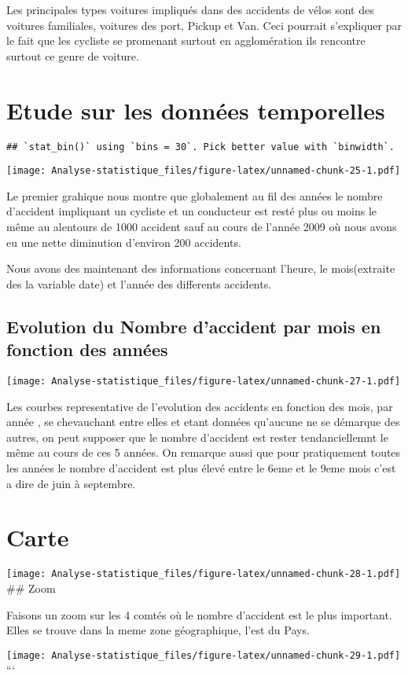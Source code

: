 \documentclass[
  french,
]{article}
\begin{document}
Les principales types voitures impliqués dans des accidents de vélos
sont des voitures familiales, voitures des port, Pickup et Van. Ceci
pourrait s'expliquer par le fait que les cycliste se promenant surtout
en agglomération ils rencontre surtout ce genre de voiture.

\hypertarget{etude-sur-les-donnuxe9es-temporelles}{%
\section{Etude sur les données
temporelles}\label{etude-sur-les-donnuxe9es-temporelles}}

\begin{verbatim}
## `stat_bin()` using `bins = 30`. Pick better value with `binwidth`.
\end{verbatim}

\texttt{[image: Analyse-statistique\_files/figure-latex/unnamed-chunk-25-1.pdf]}

Le premier grahique nous montre que globalement au fil des années le
nombre d'accident impliquant un cycliste et un conducteur est resté plus
ou moins le même au alentours de 1000 accident sauf au cours de l'année
2009 où nous avons eu une nette diminution d'environ 200 accidents.

Nous avons des maintenant des informations concernant l'heure, le
mois(extraite des la variable date) et l'année des differents accidents.

\hypertarget{evolution-du-nombre-daccident-par-mois-en-fonction-des-annuxe9es}{%
\subsection{Evolution du Nombre d'accident par mois en fonction des
années}\label{evolution-du-nombre-daccident-par-mois-en-fonction-des-annuxe9es}}

\texttt{[image: Analyse-statistique\_files/figure-latex/unnamed-chunk-27-1.pdf]}

Les courbes representative de l'evolution des accidents en fonction des
mois, par année , se chevauchant entre elles et etant données qu'aucune
ne se démarque des autres, on peut supposer que le nombre d'accident est
rester tendanciellemnt le même au cours de ces 5 années. On remarque
aussi que pour pratiquement toutes les années le nombre d'accident est
plus élevé entre le 6eme et le 9eme mois c'est a dire de juin à
septembre.

\hypertarget{carte}{%
\section{Carte}\label{carte}}

\texttt{[image: Analyse-statistique\_files/figure-latex/unnamed-chunk-28-1.pdf]}
\#\# Zoom

Faisons un zoom sur les 4 comtés où le nombre d'accident est le plus
important. Elles se trouve dans la meme zone géographique, l'est du
Pays.

\texttt{[image: Analyse-statistique\_files/figure-latex/unnamed-chunk-29-1.pdf]}
```
\end{document}
